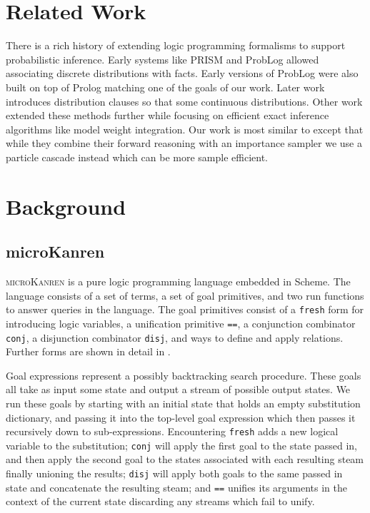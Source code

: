 \documentclass[
]{ceurart}
\begin{document}
\section{Related Work}

There is a rich history of extending logic programming formalisms to
support probabilistic inference. Early systems like
PRISM\cite{sato1997prism} and ProbLog\cite{de2007problog} allowed
associating discrete distributions with facts. Early versions of
ProbLog were also built on top of Prolog matching one of the goals of
our work. Later work\cite{gutmann2010extending} introduces
distribution clauses so that some continuous distributions. Other work
extended these methods further while focusing on efficient exact
inference algorithms like model weight
integration\cite{islam2012inference, belle2015probabilistic}. Our work
is most similar to \cite{gutmann2011magic} except that while they
combine their forward reasoning with an importance sampler we use a
particle cascade instead which can be more sample efficient.

\section{Background}

\subsection{microKanren}

\textsc{microKanren}\cite{10.1145/2989225.2989230, daniel2018reasoned}
is a pure logic programming language embedded in Scheme. The language
consists of a set of terms, a set of goal primitives, and two run
functions to answer queries in the language. The goal primitives
consist of a \texttt{fresh} form for introducing logic variables, a
unification primitive \texttt{==}, a conjunction combinator
\texttt{conj}, a disjunction combinator \texttt{disj}, and ways to
define and apply relations. Further forms are shown in detail in
.

Goal expressions represent a possibly backtracking search
procedure. These goals all take as input some state and output a
stream of possible output states. We run these goals by starting with
an initial state that holds an empty substitution dictionary, and
passing it into the top-level goal expression which then passes it
recursively down to sub-expressions. Encountering \texttt{fresh} adds
a new logical variable to the substitution; \texttt{conj} will apply
the first goal to the state passed in, and then apply the second goal
to the states associated with each resulting steam finally unioning
the results; \texttt{disj} will apply both goals to the same passed in
state and concatenate the resulting steam; and \texttt{==} unifies its
arguments in the context of the current state discarding any streams
which fail to unify.
\end{document}
